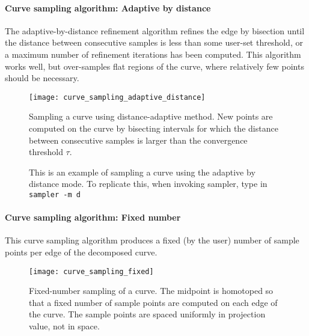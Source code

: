 \paragraph{Curve sampling algorithm: Adaptive by distance}

The adaptive-by-distance refinement algorithm refines the edge by bisection until the distance between consecutive samples is less than some user-set threshold, or a maximum number of refinement iterations has been computed.  This algorithm works well, but over-samples flat regions of the curve, where relatively few points should be necessary.  


\begin{figure}[H]
\begin{center}
\texttt{[image: curve\_sampling\_adaptive\_distance]}
\caption[Adaptive-distance curve sampling]{Sampling a curve using distance-adaptive method.  New points are computed on the curve by bisecting intervals for which the distance between consecutive samples is larger than the convergence threshold $\tau$.}
\end{center}
\end{figure}

\begin{figure}[!htb]\centering
     \caption{This is an example of sampling a curve using the adaptive by distance mode. To replicate this, when invoking sampler, type in { \tt sampler -m d}}
\end{figure}

\paragraph{Curve sampling algorithm: Fixed number}

This curve sampling algorithm produces a fixed (by the user) number of sample points per edge of the decomposed curve.  


\begin{figure}[H]
\begin{center}
\texttt{[image: curve\_sampling\_fixed]}
\caption[Fixed-number sampling of a curve -- how it works]{Fixed-number sampling of a curve.  The midpoint is homotoped so that a fixed number of sample points are computed on each edge of the curve.  The sample points are spaced uniformly in projection value, not in space.}
\end{center}
\end{figure}

